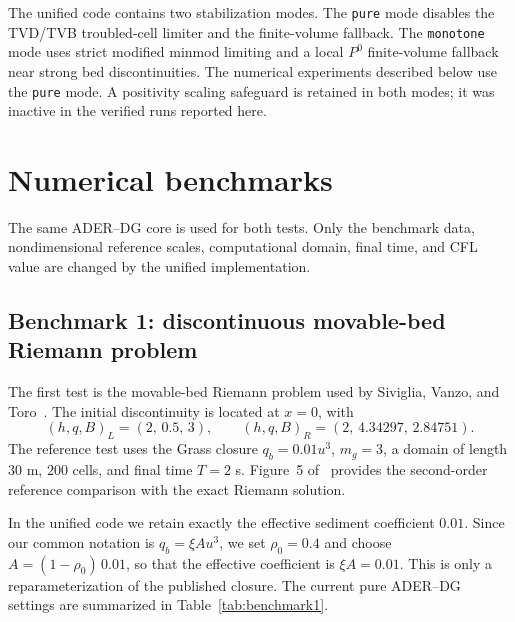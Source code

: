 \documentclass[11pt]{article}
\begin{document}
The unified code contains two stabilization modes. The \texttt{pure} mode disables the TVD/TVB troubled-cell limiter and the finite-volume fallback. The \texttt{monotone} mode uses strict modified minmod limiting and a local $P^0$ finite-volume fallback near strong bed discontinuities. The numerical experiments described below use the \texttt{pure} mode. A positivity scaling safeguard is retained in both modes; it was inactive in the verified runs reported here.

\section{Numerical benchmarks}

The same ADER--DG core is used for both tests. Only the benchmark data, nondimensional reference scales, computational domain, final time, and CFL value are changed by the unified implementation.

\subsection{Benchmark 1: discontinuous movable-bed Riemann problem}

The first test is the movable-bed Riemann problem used by Siviglia, Vanzo, and Toro~\cite{siviglia2022}. The initial discontinuity is located at $x=0$, with
\begin{equation}
    (h,q,B)_L=(2,\,0.5,\,3),
    \qquad
    (h,q,B)_R=(2,\,4.34297,\,2.84751).
    \label{eq:riemann-data}
\end{equation}
The reference test uses the Grass closure $q_b=0.01u^3$, $m_g=3$, a domain of length $30$ m, $200$ cells, and final time $T=2$ s. Figure~5 of~\cite{siviglia2022} provides the second-order reference comparison with the exact Riemann solution.

In the unified code we retain exactly the effective sediment coefficient $0.01$. Since our common notation is $q_b=\xi A u^3$, we set $\rho_0=0.4$ and choose $A=(1-\rho_0)\,0.01$, so that the effective coefficient is $\xi A=0.01$. This is only a reparameterization of the published closure. The current pure ADER--DG settings are summarized in Table~\ref{tab:benchmark1}.
\end{document}
